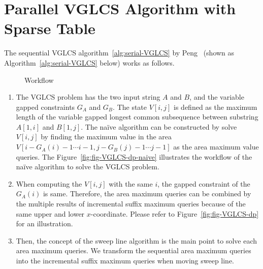 \section{Parallel VGLCS Algorithm with Sparse Table} %
\label{sec:parallelVGLCS}


The sequential VGLCS algorithm~\ref{alg:serial-VGLCS} by
Peng~\cite{Peng2011TheLC} (shown as Algorithm~\ref{alg:serial-VGLCS}
below) works as follows.  


\begin{figure}[!thb]
  \centering
  \caption{Workflow}
\end{figure}

\begin{enumerate}
  \item 

The VGLCS problem has the two input string $A$ and $B$, and the variable
gapped constraints $G_A$ and $G_B$.  The state $V[i, j]$ is defined as
the maximum length of the variable gapped longest common subsequence
between substring $A[1, i]$ and $B[1, j]$.  The na\"{i}ve algorithm can
be constructed by solve $V[i, j]$ by finding the maximum value in the
area $V[i-G_A(i)-1 \cdots i-1, j-G_B(j)-1 \cdots j-1]$ as the area
maximum value queries.  The Figure~\ref{fig:fig-VGLCS-dp-naive}
illustrates the workflow of the na\"{i}ve algorithm to solve the VGLCS
problem.

  \item 

When computing the $V[i, j]$ with the same $i$, the gapped constraint of
the $G_A(i)$ is same.  Therefore, the area maximum queries can be
combined by the multiple results of incremental suffix maximum queries
because of the same upper and lower $x$-coordinate.  Please refer to
Figure~\ref{fig:fig-VGLCS-dp} for an illustration.

  \item 

Then, the concept of the sweep line algorithm is the main point to solve
each area maximum queries.  We transform the sequential area maximum
queries into the incremental suffix maximum queries when moving sweep
line.


\end{enumerate}


